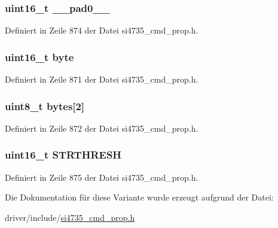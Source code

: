 \subsubsection[{\+\_\+\+\_\+pad0\+\_\+\+\_\+}]{\setlength{\rightskip}{0pt plus 5cm}uint16\+\_\+t \+\_\+\+\_\+pad0\+\_\+\+\_\+}\label{unionfm__blend__snr__stereo__thres_a77132c2c26a75f5b8751b235cda23828}


Definiert in Zeile 874 der Datei si4735\+\_\+cmd\+\_\+prop.\+h.

\hypertarget{unionfm__blend__snr__stereo__thres_ab0549c1b5ea980a02e7eab77e21fea49}{}
\subsubsection[{byte}]{\setlength{\rightskip}{0pt plus 5cm}uint16\+\_\+t byte}\label{unionfm__blend__snr__stereo__thres_ab0549c1b5ea980a02e7eab77e21fea49}


Definiert in Zeile 871 der Datei si4735\+\_\+cmd\+\_\+prop.\+h.

\hypertarget{unionfm__blend__snr__stereo__thres_a46e4c05d20a047ec169f60d3167e912e}{}
\subsubsection[{bytes}]{\setlength{\rightskip}{0pt plus 5cm}uint8\+\_\+t bytes\mbox{[}2\mbox{]}}\label{unionfm__blend__snr__stereo__thres_a46e4c05d20a047ec169f60d3167e912e}


Definiert in Zeile 872 der Datei si4735\+\_\+cmd\+\_\+prop.\+h.

\hypertarget{unionfm__blend__snr__stereo__thres_ae59cc6ed2c20ceb75c5065984e1751d1}{}
\subsubsection[{S\+T\+R\+T\+H\+R\+E\+S\+H}]{\setlength{\rightskip}{0pt plus 5cm}uint16\+\_\+t S\+T\+R\+T\+H\+R\+E\+S\+H}\label{unionfm__blend__snr__stereo__thres_ae59cc6ed2c20ceb75c5065984e1751d1}


Definiert in Zeile 875 der Datei si4735\+\_\+cmd\+\_\+prop.\+h.



Die Dokumentation für diese Variante wurde erzeugt aufgrund der Datei\+:\begin{DoxyCompactItemize}
\item 
driver/include/\hyperlink{si4735__cmd__prop_8h}{si4735\+\_\+cmd\+\_\+prop.\+h}\end{DoxyCompactItemize}
